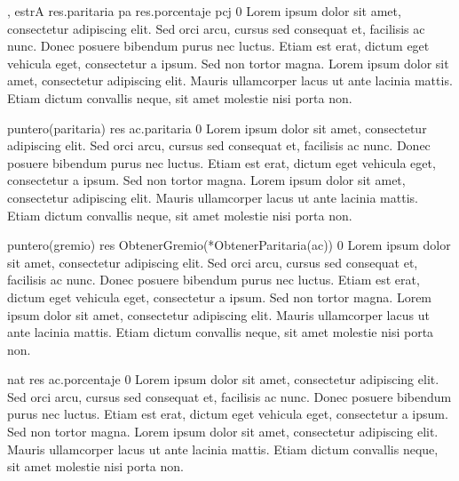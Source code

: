 {, }{estrA}
{
	\state res.paritaria \asig pa								
	\state res.porcentaje \asig pcj								
}
{0}
{Lorem ipsum dolor sit amet, consectetur adipiscing elit. Sed orci arcu, cursus sed consequat et, facilisis ac nunc. Donec posuere bibendum purus nec luctus. Etiam est erat, dictum eget vehicula eget, consectetur a ipsum. Sed non tortor magna. Lorem ipsum dolor sit amet, consectetur adipiscing elit. Mauris ullamcorper lacus ut ante lacinia mattis. Etiam dictum convallis neque, sit amet molestie nisi porta non.}

{}{puntero(paritaria)}
{
	\state res \asig ac.paritaria 								
}
{0}
{Lorem ipsum dolor sit amet, consectetur adipiscing elit. Sed orci arcu, cursus sed consequat et, facilisis ac nunc. Donec posuere bibendum purus nec luctus. Etiam est erat, dictum eget vehicula eget, consectetur a ipsum. Sed non tortor magna. Lorem ipsum dolor sit amet, consectetur adipiscing elit. Mauris ullamcorper lacus ut ante lacinia mattis. Etiam dictum convallis neque, sit amet molestie nisi porta non.}

{}{puntero(gremio)}
{
	\state res \asig ObtenerGremio(*ObtenerParitaria(ac)) 		
}
{0}
{Lorem ipsum dolor sit amet, consectetur adipiscing elit. Sed orci arcu, cursus sed consequat et, facilisis ac nunc. Donec posuere bibendum purus nec luctus. Etiam est erat, dictum eget vehicula eget, consectetur a ipsum. Sed non tortor magna. Lorem ipsum dolor sit amet, consectetur adipiscing elit. Mauris ullamcorper lacus ut ante lacinia mattis. Etiam dictum convallis neque, sit amet molestie nisi porta non.}

{}{nat}
{
	\state res \asig ac.porcentaje 								
}
{0}
{Lorem ipsum dolor sit amet, consectetur adipiscing elit. Sed orci arcu, cursus sed consequat et, facilisis ac nunc. Donec posuere bibendum purus nec luctus. Etiam est erat, dictum eget vehicula eget, consectetur a ipsum. Sed non tortor magna. Lorem ipsum dolor sit amet, consectetur adipiscing elit. Mauris ullamcorper lacus ut ante lacinia mattis. Etiam dictum convallis neque, sit amet molestie nisi porta non.}